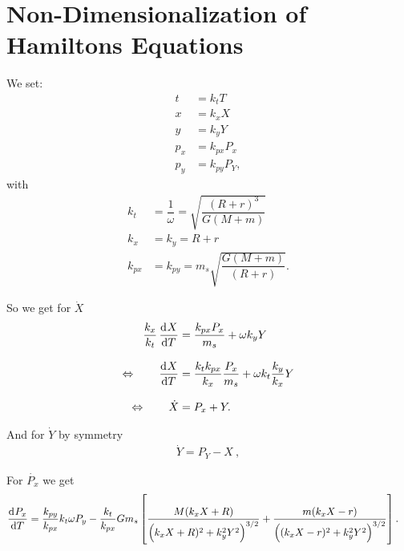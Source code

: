 \chapter{Non-Dimensionalization of Hamiltons Equations} \label{app:non-dimensionalization}
We set:
\begin{align}
t &= k_t T \\
x &= k_x X \\
y &= k_y Y \\
p_x &= k_{px} P_x \\
p_y &= k_{py} P_Y ,
\end{align}
with
\begin{align}
k_t &= \dfrac{1}{\omega} = \sqrt{\dfrac{(R+r)^3}{G(M+m)}} \\[0.5cm]
k_x &= k_y = R+r \\[0.5cm]
k_{px} &= k_{py} = m_s \sqrt{\dfrac{G(M+m)}{(R+r)}} .
\end{align}

So we get for $\dot{X}$
\begin{align}
\dfrac{k_x}{k_t} \dod{X}{T} &= \dfrac{k_{px} P_x}{m_s} + \omega k_y Y \\[0.3cm]
\Leftrightarrow \qquad \dod{X}{T} &= \dfrac{k_t k_{px}}{k_x} \dfrac{P_x}{m_s} + \omega k_t \dfrac{k_y}{k_x} Y \\[0.3cm]
\Leftrightarrow \qquad \dot{X} &= P_x + Y .
\end{align}

And for $\dot{Y}$ by symmetry
\begin{align}
\dot{Y} = P_Y - X \ ,
\end{align}

For $\dot{P_x}$ we get
\begin{align}
\dod{P_x}{T} &= \dfrac{k_{py}}{k_{px}} k_t\omega P_y - \dfrac{k_t}{k_{px}}G m_s \left[\dfrac{M(k_x X + R)}{\left(k_x X + R)^2 + k_y^2 Y^2\right)^{3/2}} + \dfrac{m (k_x X - r)}{\left((k_x X - r)^2 + k_y^2 Y^2\right)^{3/2}} \right].
\end{align}

